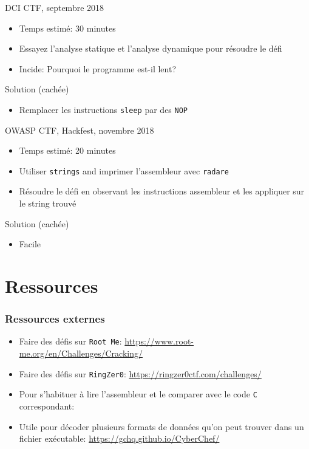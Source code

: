 \documentclass[10pt,xcolor={table,dvipsnames},t]{beamer}
\begin{document}
\begin{frame}{DCI CTF, septembre 2018}
    \begin{itemize}
        \item Temps estimé: 30 minutes
        \item Essayez l'analyse statique et l'analyse dynamique pour résoudre le défi
        \item Incide: Pourquoi le programme est-il lent?
    \end{itemize}
    
    \begin{block}{Solution (cachée)}
        \begin{itemize}
            \item Remplacer les instructions \texttt{sleep} par des \texttt{NOP}
        \end{itemize}
    \end{block}
\end{frame}

\begin{frame}{OWASP CTF, Hackfest, novembre 2018}
    \begin{itemize}
        \item Temps estimé: 20 minutes
        \item Utiliser \texttt{strings} and imprimer l'assembleur avec \texttt{radare}
        \item Résoudre le défi en observant les instructions assembleur et les appliquer sur le string trouvé
    \end{itemize}
    
    \begin{block}{Solution (cachée)}
        \begin{itemize}
            \item Facile
        \end{itemize}
    \end{block}
\end{frame}

\fi %

\section{Ressources}

\begin{frame}
    \frametitle{Ressources externes}
    \begin{itemize}
        \item Faire des défis sur \texttt{Root Me}: \url{https://www.root-me.org/en/Challenges/Cracking/}
        \item Faire des défis sur \texttt{RingZer0}: \url{https://ringzer0ctf.com/challenges/}
        \item Pour s'habituer à lire l'assembleur et le comparer avec le code \texttt{C} correspondant: 
        \item Utile pour décoder plusieurs formats de données qu'on peut trouver dans un fichier exécutable: \url{https://gchq.github.io/CyberChef/}
    \end{itemize}
\end{frame}
\end{document}
